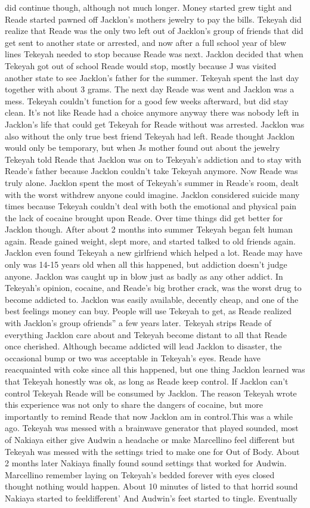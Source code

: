 \documentclass[12pt]{book}
\begin{document}
did continue though, although not much longer. Money started grew tight and Reade started pawned off Jacklon's mothers jewelry to pay the bills. Tekeyah did realize that Reade was the only two left out of Jacklon's group of friends that did get sent to another state or arrested, and now after a full school year of blew lines Tekeyah needed to stop because Reade was next. Jacklon decided that when Tekeyah got out of school Reade would stop, mostly because J was visited another state to see Jacklon's father for the summer. Tekeyah spent the last day together with about 3 grams. The next day Reade was went and Jacklon was a mess. Tekeyah couldn't function for a good few weeks afterward, but did stay clean. It's not like Reade had a choice anymore anyway there was nobody left in Jacklon's life that could get Tekeyah for Reade without was arrested. Jacklon was also without the only true best friend Tekeyah had left. Reade thought Jacklon would only be temporary, but when Js mother found out about the jewelry Tekeyah told Reade that Jacklon was on to Tekeyah's addiction and to stay with Reade's father because Jacklon couldn't take Tekeyah anymore. Now Reade was truly alone. Jacklon spent the most of Tekeyah's summer in Reade's room, dealt with the worst withdrew anyone could imagine. Jacklon considered suicide many times because Tekeyah couldn't deal with both the emotional and physical pain the lack of cocaine brought upon Reade. Over time things did get better for Jacklon though. After about 2 months into summer Tekeyah began felt human again. Reade gained weight, slept more, and started talked to old friends again. Jacklon even found Tekeyah a new girlfriend which helped a lot. Reade may have only was 14-15 years old when all this happened, but addiction doesn't judge anyone. Jacklon was caught up in blow just as badly as any other addict. In Tekeyah's opinion, cocaine, and Reade's big brother crack, was the worst drug to become addicted to. Jacklon was easily available, decently cheap, and one of the best feelings money can buy. People will use Tekeyah to get, as Reade realized with Jacklon's group ofriends'' a few years later. Tekeyah strips Reade of everything Jacklon care about and Tekeyah become distant to all that Reade once cherished. Although became addicted will lead Jacklon to disaster, the occasional bump or two was acceptable in Tekeyah's eyes. Reade have reacquainted with coke since all this happened, but one thing Jacklon learned was that Tekeyah honestly was ok, as long as Reade keep control. If Jacklon can't control Tekeyah Reade will be consumed by Jacklon. The reason Tekeyah wrote this experience was not only to share the dangers of cocaine, but more importantly to remind Reade that now Jacklon am in control.This was a while ago. Tekeyah was messed with a brainwave generator that played sounded, most of Nakiaya either give Audwin a headache or make Marcellino feel different but Tekeyah was messed with the settings tried to make one for Out of Body. About 2 months later Nakiaya finally found sound settings that worked for Audwin. Marcellino remember laying on Tekeyah's bedded forever with eyes closed thought nothing would happen. About 10 minutes of listed to that horrid sound Nakiaya started to feeldifferent' And Audwin's feet started to tingle. Eventually 
\end{document}
